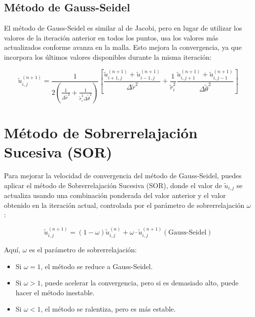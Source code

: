 \subsection{Método de Gauss-Seidel}

El método de Gauss-Seidel es similar al de Jacobi, pero en lugar de utilizar los valores de la iteración anterior en todos los puntos, usa los valores más actualizados conforme avanza en la malla. Esto mejora la convergencia, ya que incorpora los últimos valores disponibles durante la misma iteración:

\begin{equation}
    \tilde{u}_{i,j}^{(n+1)} = \frac{1}{2 \left(\frac{1}{\Delta \tilde{r}^2} + \frac{1}{\tilde{r}_i^2 \Delta \tilde{\theta}^2}\right)} 
    \left[ \frac{\tilde{u}_{i+1,j}^{(n+1)} + \tilde{u}_{i-1,j}^{(n+1)}}{\Delta \tilde{r}^2} 
    + \frac{1}{\tilde{r}_i^2} \frac{\tilde{u}_{i,j+1}^{(n+1)} + \tilde{u}_{i,j-1}^{(n+1)}}{\Delta \tilde{\theta}^2} \right]
\end{equation}

\section{Método de Sobrerrelajación Sucesiva (SOR)}

Para mejorar la velocidad de convergencia del método de Gauss-Seidel, puedes aplicar el método de Sobrerrelajación Sucesiva (SOR), donde el valor de \( \tilde{u}_{i,j} \) se actualiza usando una combinación ponderada del valor anterior y el valor obtenido en la iteración actual, controlada por el parámetro de sobrerrelajación \( \omega \):

\begin{equation}
    \tilde{u}_{i,j}^{(n+1)} = (1 - \omega) \tilde{u}_{i,j}^{(n)} + \omega \cdot \tilde{u}_{i,j}^{(n+1)}(\text{Gauss-Seidel})
\end{equation}

Aquí, \( \omega \) es el parámetro de sobrerrelajación:

\begin{itemize}
    \item Si \( \omega = 1 \), el método se reduce a Gauss-Seidel.
    \item Si \( \omega > 1 \), puede acelerar la convergencia, pero si es demasiado alto, puede hacer el método inestable.
    \item Si \( \omega < 1 \), el método se ralentiza, pero es más estable.
\end{itemize}

